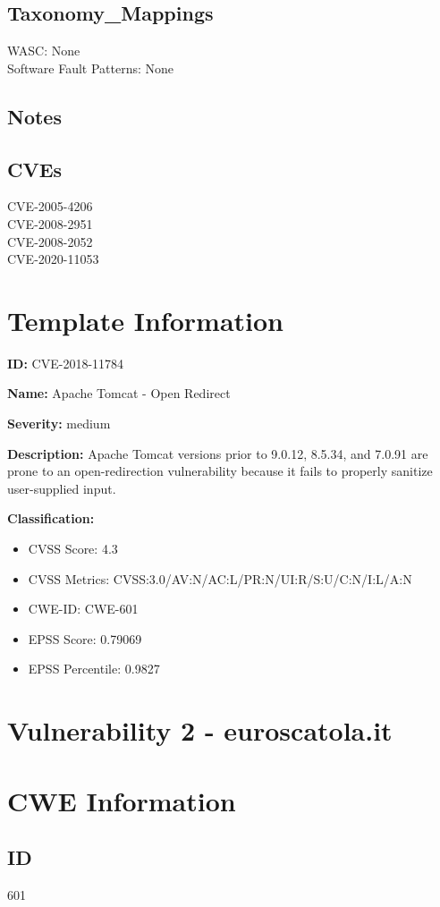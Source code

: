 \subsection*{Taxonomy\_Mappings}
WASC: None\\
Software Fault Patterns: None\\
\subsection*{Notes}
\subsection*{CVEs}
CVE-2005-4206\\
CVE-2008-2951\\
CVE-2008-2052\\
CVE-2020-11053\\
\section*{Template Information}
\textbf{ID:} CVE-2018-11784

\textbf{Name:} Apache Tomcat - Open Redirect

\textbf{Severity:} medium

\textbf{Description:} Apache Tomcat versions prior to 9.0.12, 8.5.34, and 7.0.91 are prone to an open-redirection vulnerability because it fails to properly sanitize user-supplied input.


\textbf{Classification:}
\begin{itemize}
\item CVSS Score: 4.3
\item CVSS Metrics: CVSS:3.0/AV:N/AC:L/PR:N/UI:R/S:U/C:N/I:L/A:N
\item CWE-ID: CWE-601
\item EPSS Score: 0.79069
\item EPSS Percentile: 0.9827
\end{itemize}



\section*{Vulnerability 2 - euroscatola.it}

\section*{CWE Information}
\subsection*{ID}
601

